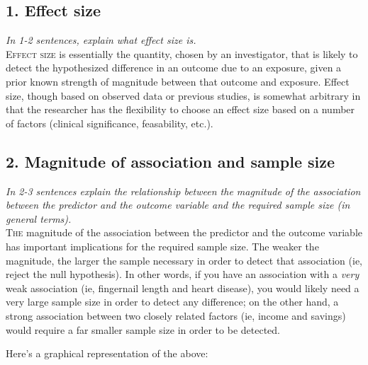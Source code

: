 \documentclass[11pt]{article}
\begin{document}
\begin{multicols}{2} 

\subsection*{1. Effect size}
\emph{In 1-2 sentences, explain what effect size is.}\\

\lettrine[nindent=0em,lines=3]{E}{ffect size} is essentially the quantity, chosen by an investigator, that is likely to detect the hypothesized difference in an outcome due to an exposure, given a prior known strength of magnitude between that outcome and exposure.  Effect size, though based on observed data or previous studies, is somewhat arbitrary in that the researcher has the flexibility to choose an effect size based on a number of factors (clinical significance, feasability, etc.).\cite{dcr} 

\subsection*{2. Magnitude of association and sample size}
\emph{In 2-3 sentences explain the relationship between the magnitude of the association between the predictor and the outcome variable and the required sample size (in general terms).} \\
\lettrine[nindent=0em,lines=3]{T}{he} magnitude of the association between the predictor and the outcome variable has important implications for the required sample size.  The weaker the magnitude, the larger the sample necessary in order to detect that association (ie, reject the null hypothesis).  In other words, if you have an association with a \emph{very} weak association (ie, fingernail length and heart disease), you would likely need a very large sample size in order to detect any difference; on the other hand, a strong association between two closely related factors (ie, income and savings) would require a far smaller sample size in order to be detected.

Here's a graphical representation of the above:


\end{multicols}
\end{document}
